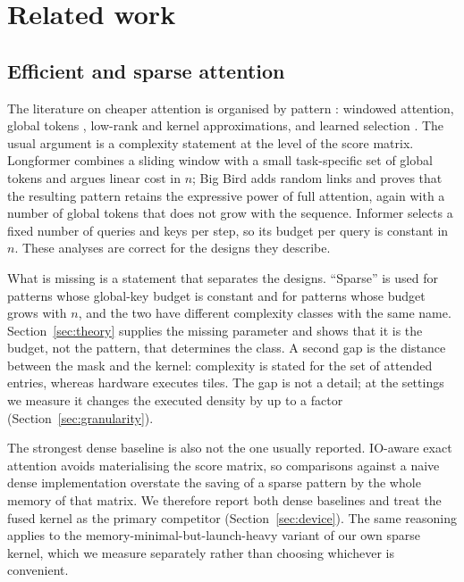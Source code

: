 \section{Related work}\label{sec:related}

\subsection{Efficient and sparse attention}

The literature on cheaper attention is organised by pattern
\cite{tay2022efficient}: windowed attention, global tokens
\cite{beltagy2020longformer,zaheer2020bigbird}, low-rank and kernel
approximations, and learned selection \cite{zhou2021informer}. The usual
argument is a complexity statement at the level of the score matrix. Longformer
combines a sliding window with a small task-specific set of global tokens and
argues linear cost in $n$; Big Bird adds random links and proves that the
resulting pattern retains the expressive power of full attention, again with a
number of global tokens that does not grow with the sequence. Informer selects a
fixed number of queries and keys per step, so its budget per query is constant
in $n$. These analyses are correct for the designs they describe.

What is missing is a statement that separates the designs. ``Sparse'' is used
for patterns whose global-key budget is constant and for patterns whose budget
grows with $n$, and the two have different complexity classes with the same
name. Section~\ref{sec:theory} supplies the missing parameter and shows that it
is the budget, not the pattern, that determines the class. A second gap is the
distance between the mask and the kernel: complexity is stated for the set of
attended entries, whereas hardware executes tiles. The gap is not a detail; at
the settings we measure it changes the executed density by up to a factor
\BlockInflationGranMax (Section~\ref{sec:granularity}).

The strongest dense baseline is also not the one usually reported. IO-aware
exact attention \cite{dao2022flashattention} avoids materialising the score
matrix, so comparisons against a naive dense implementation overstate the saving
of a sparse pattern by the whole memory of that matrix. We therefore report both
dense baselines and treat the fused kernel as the primary competitor
(Section~\ref{sec:device}). The same reasoning applies to the
memory-minimal-but-launch-heavy variant of our own sparse kernel, which we
measure separately rather than choosing whichever is convenient.


